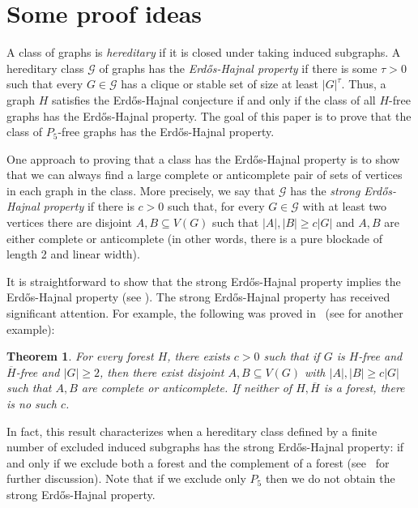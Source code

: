 \documentclass[11pt,reqno,a4paper]{amsart}
\newtheorem{theorem}{Theorem}[section]
\renewcommand{\subset}{\subseteq}
\begin{document}
	
	
	
	\section{Some proof ideas}
	\label{sec:sketch}
	
	
	A class of graphs is {\em hereditary} if it is closed under taking induced subgraphs.
	A hereditary class $\mathcal G$ of graphs has the {\em Erd\H os-Hajnal property} if there is some $\tau>0$ such that every 
	$G\in\mathcal G$ has a clique or stable set of size at least $|G|^\tau$.  Thus, a graph $H$ satisfies the Erd\H os-Hajnal conjecture if and only if the class of all $H$-free graphs has the Erd\H os-Hajnal property. The goal of this paper is to prove that the class of $P_5$-free graphs has the Erd\H os-Hajnal property.
	
	One approach to proving that a class has the Erd\H os-Hajnal property is to show that we can always find a large complete or anticomplete pair of sets of vertices in each graph in the class.  More precisely, we say that $\mathcal G$ has the {\em strong Erd\H os-Hajnal 
		property} if there is $c>0$ such that, for every $G\in\mathcal G$ with at least two vertices there are disjoint $A,B\subset V(G)$ such that $|A|,|B|\ge c|G|$ and $A,B$ are either complete or anticomplete (in other words, there is a pure blockade of length 2 and linear width).  
	
	It is straightforward to show that the strong Erd\H os-Hajnal property implies the Erd\H os-Hajnal property (see \cite{alonplus, foxpach}). The strong Erd\H os-Hajnal property has received significant attention.
	For example, the following was proved in~\cite{MR4170220} (see \cite{pure2} for another example):
	\begin{theorem} \label{pure1a}
		For every forest $H$, there exists $c>0$ such that if $G$ is $H$-free and $\overline H$-free and $|G|\ge 2$, 
		then there exist disjoint $A,B\subseteq V(G)$ with $|A|,|B|\ge c|G|$ such that $A,B$ are complete or anticomplete. If 
		neither of $H, \overline{H}$ is a forest,
		there is no such $c$.
	\end{theorem}
	In fact, this result characterizes when a hereditary class defined by a finite number of excluded induced subgraphs has the 
	strong Erd\H os-Hajnal property: if and only if we exclude both a forest and the complement of a forest (see~\cite{MR4170220} for further discussion).  Note that if we exclude only $P_5$ then we do not obtain the strong Erd\H os-Hajnal property.
	
\end{document}
